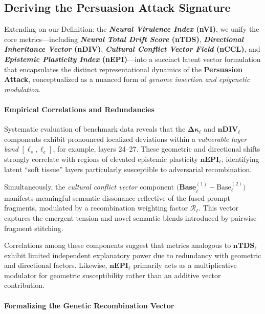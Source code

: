 \subsection*{\textbf{Deriving the Persuasion Attack Signature}}

Extending on our Definition: the \textbf{\textit{Neural Virulence Index} (nVI)}, we unify the core metrics—including \textbf{\textit{Neural Total Drift Score} (nTDS)}, \textbf{\textit{Directional Inheritance Vector} (nDIV)}, \textbf{\textit{Cultural Conflict Vector Field} (nCCL)}, and \textbf{\textit{Epistemic Plasticity Index} (nEPI)}—into a succinct latent vector formulation that encapsulates the distinct representational dynamics of the \textbf{Persuasion Attack}, conceptualized as a nuanced form of \emph{genome insertion and epigenetic modulation}. 

\vspace{0.5em}
\paragraph{\textbf{Empirical Correlations and Redundancies}}

Systematic evaluation of benchmark data reveals that the \(\boldsymbol{\Delta \kappa_\ell}\) and \(\mathbf{nDIV_\ell}\) components exhibit pronounced localized deviations within a \emph{vulnerable layer band} \([\ell_s, \ell_e]\), for example, layers 24--27. These geometric and directional shifts strongly correlate with regions of elevated epistemic plasticity \(\mathbf{nEPI_\ell}\), identifying latent “soft tissue” layers particularly susceptible to adversarial recombination.

Simultaneously, the \emph{cultural conflict vector} component \(\mathbf{(Base}_\ell^{(1)} - \text{Base}_\ell^{(2)})\) manifests meaningful semantic dissonance reflective of the fused prompt fragments, modulated by a recombination weighting factor \(\mathcal{R}_\ell\). This vector captures the emergent tension and novel semantic blends introduced by pairwise fragment stitching.

Correlations among these components suggest that metrics analogous to \(\mathbf{nTDS_\ell}\) exhibit limited independent explanatory power due to redundancy with geometric and directional factors. Likewise, \(\mathbf{nEPI_\ell}\) primarily acts as a multiplicative modulator for geometric susceptibility rather than an additive vector contribution.

\vspace{0.5em}
\paragraph{\textbf{Formalizing the Genetic Recombination Vector}}

